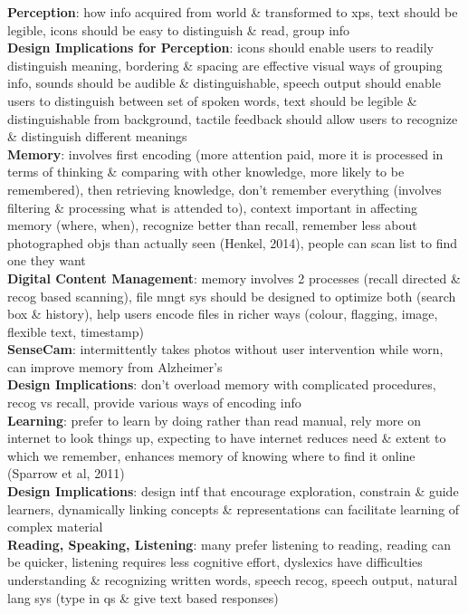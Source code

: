 \documentclass[a4paper]{article}
\begin{document}
\begin{multicols}{3}
        \textbf{Perception}: how info acquired from world \& transformed to xps, text should be legible, icons should be easy to distinguish \& read, group info\\
        \textbf{Design Implications for Perception}: icons should enable users to readily distinguish meaning, bordering \& spacing are effective visual ways of grouping info, sounds should be audible \& distinguishable, speech output should enable users to distinguish between set of spoken words, text should be legible \& distinguishable from background, tactile feedback should allow users to recognize \& distinguish different meanings\\
        \textbf{Memory}: involves first encoding (more attention paid, more it is processed in terms of thinking \& comparing with other knowledge, more likely to be remembered), then retrieving knowledge, don't remember everything (involves filtering \& processing what is attended to), context important in affecting memory (where, when), recognize better than recall, remember less about photographed objs than actually seen (Henkel, 2014), people can scan list to find one they want\\
        \textbf{Digital Content Management}: memory involves 2 processes (recall directed \& recog based scanning), file mngt sys should be designed to optimize both (search box \& history), help users encode files in richer ways (colour, flagging, image, flexible text, timestamp)\\
        \textbf{SenseCam}: intermittently takes photos without user intervention while worn, can improve memory from Alzheimer's\\
        \textbf{Design Implications}: don't overload memory with complicated procedures, recog vs recall, provide various ways of encoding info\\
        \textbf{Learning}: prefer to learn by doing rather than read manual, rely more on internet to look things up, expecting to have internet reduces need \& extent to which we remember, enhances memory of knowing where to find it online (Sparrow et al, 2011)\\
        \textbf{Design Implications}: design intf that encourage exploration, constrain \& guide learners, dynamically linking concepts \& representations can facilitate learning of complex material\\
        \textbf{Reading, Speaking, Listening}: many prefer listening to reading, reading can be quicker, listening requires less cognitive effort, dyslexics have difficulties understanding \& recognizing written words, speech recog, speech output, natural lang sys (type in qs \& give text based responses)\\

\end{multicols}
\end{document}
